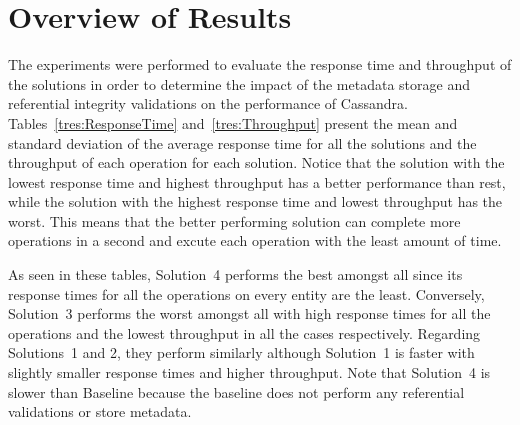 \section{Overview of Results} \label{s:results-overview}

The experiments were performed to evaluate the response time and throughput of
the solutions in order to determine the impact of the metadata storage and
referential integrity validations on the performance of Cassandra. 
Tables~\ref{tres:ResponseTime} and~\ref{tres:Throughput} present the mean and
standard deviation of the average response time for all the solutions and the
throughput of each operation for each solution.  Notice that the solution with the lowest
response time and highest throughput has a better performance than rest,  while
the solution with the highest response time and lowest throughput has the worst. 
This means that the better performing solution can complete more operations in a
second and excute each operation with the least amount of time. 



As seen in these tables,  Solution~4 performs the best amongst all since its
response times for all the  operations on every entity are the least. 
Conversely,  Solution~3 performs the worst amongst all with high response times
for all the operations and the lowest throughput in all the cases respectively. 
Regarding Solutions~1 and 2,  they perform similarly although Solution~1 is
faster with slightly smaller response times and higher throughput.  Note that
Solution~4 is slower than  Baseline  because the baseline does not perform any
referential validations or store metadata. 

